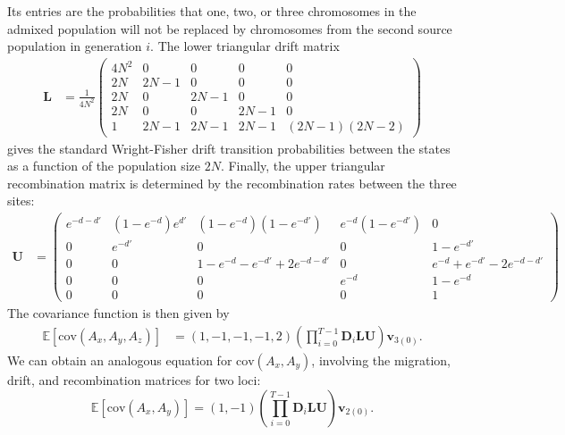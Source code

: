 Its entries are the probabilities that one, two, or three chromosomes in the admixed population will not be replaced by chromosomes from the second source population in generation $i$. The lower triangular drift matrix 
\begin{align*}
	\mathbf{L}&=\frac{1}{4N^2}\left( \begin{array}{ccccc}
					 4N^2 		& 0 	& 0 & 0 & 0\\
					 2N 	& 2N-1 & 0 & 0 & 0\\
					 2N 	& 0 & 2N-1 & 0 & 0\\
					 2N 	& 0 & 0 & 2N-1 & 0\\
					 1 & 2N-1 & 2N-1 & 2N-1 & (2N-1)(2N-2)
				\end{array} \right)
\end{align*}
gives the standard Wright-Fisher drift transition probabilities between the states as a function of the population size $2N$. Finally, the upper triangular recombination matrix is determined by the recombination rates between the three sites:
\begin{align*}
	\mathbf{U} &=
		\left( \begin{array}{ccccc}
		e^{-d-d'} & (1-e^{-d})e^{d'} & (1-e^{-d})(1-e^{-d'}) & e^{-d}(1-e^{-d'}) & 0 \\
		0 & e^{-d'} & 0 & 0 & 1-e^{-d'} \\
		0 & 0 & 1-e^{-d}-e^{-d'}+2e^{-d-d'} & 0 & e^{-d}+e^{-d'}-2e^{-d-d'} \\ 
		0 & 0 & 0 & e^{-d} & 1-e^{-d} \\ 
		0 & 0 & 0 & 0 & 1 \end{array} \right)
\end{align*}
The covariance function is then given by
\begin{align}
	\mathbb{E}[\text{cov}(A_x,A_y,A_z)] &= \left(1,-1,-1,-1,2\right)\left(\prod_{i=0}^{T-1} \textbf{D}_i \mathbf{L}\mathbf{U}\right)\textbf{v}_{3(0)}.
	\label{cov}
\end{align} 
We can obtain an analogous equation for $\text{cov}(A_x,A_y)$, involving the migration, drift, and recombination matrices for two loci:
$$
	\mathbb{E}[\text{cov}(A_x,A_y)] = \left(1,-1\right)\left(\prod_{i=0}^{T-1} \textbf{D}_i \mathbf{L}\mathbf{U}\right)\textbf{v}_{2(0)}.
$$

